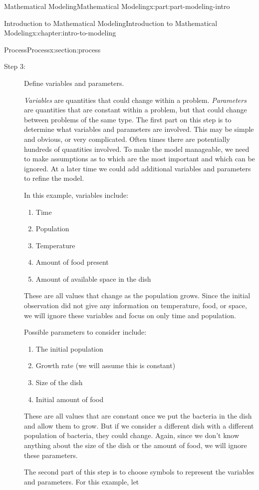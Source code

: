 \documentclass[oneside,10pt,]{book}
\numberwithin{equation}{section}
\begin{document}
\begin{partptx}{Mathematical Modeling}{}{Mathematical Modeling}{}{}{x:part:part-modeling-intro}
\begin{chapterptx}{Introduction to Mathematical Modeling}{}{Introduction to Mathematical Modeling}{}{}{x:chapter:intro-to-modeling}
\begin{sectionptx}{Process}{}{Process}{}{}{x:section:process}
\begin{description}
\item[{Step 3:}]Define variables and parameters.%
\par
\emph{Variables} are quantities that could change within a problem. \emph{Parameters} are quantities that are constant within a problem, but that could change between problems of the same type. The first part on this step is to determine what variables and parameters are involved. This may be simple and obvious, or very complicated. Often times there are potentially hundreds of quantities involved. To make the model manageable, we need to make assumptions as to which are the most important and which can be ignored. At a later time we could add additional variables and parameters to refine the model.%
\par
In this example, variables include:%
\par
%
\begin{enumerate}
\item{}Time%
\item{}Population%
\item{}Temperature%
\item{}Amount of food present%
\item{}Amount of available space in the dish%
\end{enumerate}
%
\par
These are all values that change as the population grows. Since the initial observation did not give any information on temperature, food, or space, we will ignore these variables and focus on only time and population.%
\par
Possible parameters to consider include:%
\par
%
\begin{enumerate}
\item{}The initial population%
\item{}Growth rate (we will assume this is constant)%
\item{}Size of the dish%
\item{}Initial amount of food%
\end{enumerate}
%
\par
These are all values that are constant once we put the bacteria in the dish and allow them to grow. But if we consider a different dish with a different population of bacteria, they could change. Again, since we don’t know anything about the size of the dish or the amount of food, we will ignore these parameters.%
\par
The second part of this step is to choose symbols to represent the variables and parameters. For this example, let%

\end{description}
\end{sectionptx}
\end{chapterptx}
\end{partptx}
\end{document}
